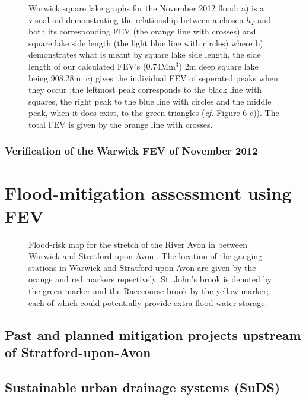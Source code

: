 \documentclass[11pt,a4paper]{article}
\begin{document}
\begin{figure}[H]
\centering
{}
\hfill
{}
\caption{Warwick square lake graphs for the November 2012 flood: a) is a visual aid demonstrating the relationship between a chosen $h_T$ and both its corresponding FEV (the orange line with crosses) and square lake side length (the light blue line with circles) where b) demonstrates what is meant by square lake side length, the side length of our calculated FEV's (0.74Mm$^3$) 2m deep square lake being 908.28m. c) gives the individual FEV of seperated peaks when they occur {;}the leftmost peak corresponds to the black line with squares, the right peak to the blue line with circles and the middle peak, when it does exist, to the green triangles (\textit{cf.} Figure 6 c)). The total FEV is given by the orange line with crosses.}
\end{figure}

\subsubsection{Verification of the Warwick FEV of November 2012}

\newpage
\section{Flood-mitigation assessment using FEV}
\begin{figure}[H]
\begin{center}
\caption{Flood-risk map for the stretch of the River Avon in between Warwick and Stratford-upon-Avon \cite{flood-risk}. The location of the gauging stations in Warwick and Stratford-upon-Avon are given by the orange and red markers repectively. St. John's brook is denoted by the green marker and the Racecourse brook by the yellow marker{;} each of which could potentially provide extra flood water storage.}
\end{center}
\end{figure}

\subsection{Past and planned mitigation projects upstream of Stratford-upon-Avon}

\subsection{Sustainable urban drainage systems (SuDS)}
\end{document}
